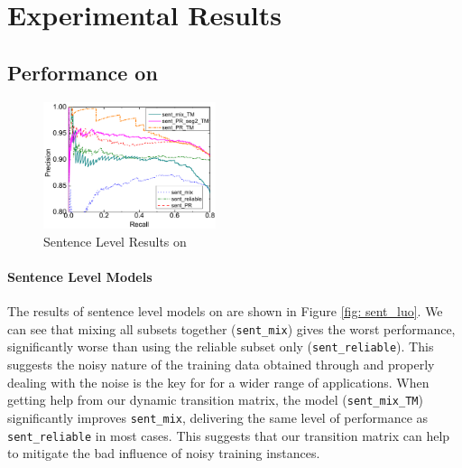 \section{Experimental Results \label{sec:evaluation}}




\subsection{Performance on \TimeRE} \label{sec:results_in_TimeRE}
\begin{figure}[t!]
\setlength{\abovecaptionskip}{3pt}
\setlength{\belowcaptionskip}{-15pt}
\begin{center}
\includegraphics[width=0.45\textwidth]{figures/sent_time_exp_overall.pdf}
\caption{Sentence Level Results on \TimeRE}
\label{fig: sent_luo}
\end{center}
\end{figure}
\paragraph{Sentence Level Models}
The results of sentence level models on \TimeRE are shown in Figure \ref{fig:
sent_luo}. We can see that mixing all subsets together (\texttt{sent\_mix})
gives the worst performance,  significantly
worse than using the reliable subset only (\texttt{sent\_reliable}). This
suggests the noisy nature of the training data obtained through \DS and
properly dealing with the noise is the key for \DS for a wider range of applications. %
When getting help from our dynamic transition matrix, %
the model (\texttt{sent\_mix\_TM}) significantly improves \texttt{sent\_mix},
delivering the same level of performance as \texttt{sent\_reliable} in most
cases. This suggests that our transition matrix can help to mitigate the bad influence of noisy training instances.



